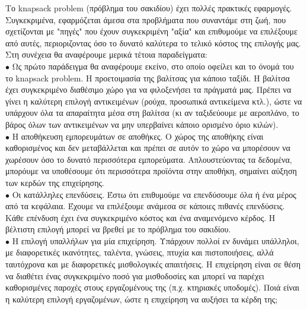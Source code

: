 \documentclass[12pt]{article}
\begin{document}
Το knapsack problem (πρόβλημα του σακιδίου) έχει πολλές πρακτικές εφαρμογές. Συγκεκριμένα, εφαρμόζεται άμεσα  στα προβλήματα που συναντάμε στη ζωή, που σχετίζονται με "πηγές" που έχουν συγκεκριμένη "αξία" και επιθυμούμε να επιλέξουμε από αυτές, περιοριζοντας όσο το δυνατό καλύτερα το τελικό κόστος της επιλογής μας.\\

Στη συνέχεια θα αναφέρουμε μερικά τέτοια παραδείγματα: \\
\(\bullet\) Ως πρώτο παράδειγμα θα αναφέρουμε εκείνο, στο οποίο οφείλει και το όνομά του το knapsack problem. Η προετοιμασία της βαλίτσας για κάποιο ταξίδι. Η βαλίτσα έχει συγκεκριμένο διαθέσιμο χώρο για να φιλοξενήσει τα πράγματά μας. Πρέπει να γίνει η καλύτερη επιλογή αντικειμένων (ρούχα, προσωπικά αντικείμενα κτλ.), ώστε να υπάρχουν όλα τα απαραίτητα μέσα στη βαλίτσα (κι αν ταξιδεύουμε με αεροπλάνο, το βάρος όλων των αντικειμένων να μην υπερβαίνει κάποιο ορισμένο όριο κιλών). \\

\(\bullet\) Η αποθήκευση εμπορευμάτων σε αποθήκες. Ο χώρος της αποθήκης είναι καθορισμένος και δεν μεταβάλλεται και πρέπει σε αυτόν το χώρο να μπορέσουν να χωρέσουν όσο το δυνατό περισσότερα εμπορεύματα. Απλουστεύοντας τα δεδομένα, μπορόυμε να υποθέσουμε ότι περισσότερα προϊόντα στην αποθήκη, σημαίνει αύξηση των κερδών της επιχείρησης. \\

\(\bullet\) Οι κατάλληλες επενδύσεις. Έστω  ότι επιθυμούμε να επενδύσουμε όλα ή ένα  μέρος  από τα κεφάλαια. Έχουμε να επιλέξουμε ανάμεσα  σε κάποιες πιθανές επενδύσεις. Κάθε επένδυση έχει ένα συγκεκριμένο κόστος και ένα αναμενόμενο κέρδος. Η βέλτιστη επιλογή μπορεί να βρεθεί με το πρόβλημα του σακιδίου. \\

\(\bullet\) Η επιλογή υπαλλήλων για μία επιχείρηση. Υπάρχουν πολλοί εν δυνάμει υπάλληλοι, με διαφορετικές ικανότητες, ταλέντα, γνώσεις, πτυχία και πιστοποιήσεις, αλλά ταυτόχρονα και με διαφορετικές μισθολογικές απαιτήσεις. Η επιχείρηση είναι σε θέση να διαθέτει ένας συγκεκριμένο ποσό για μισθοδοσίες και μπορεί να παρέχει καθορισμένες παροχές στους εργαζομένους της (π.χ. κτηριακές υποδομές). Ποιά είναι η καλύτερη επιλογή εργαζομένων, ώστε η επιχείρηση να αυξήσει τα κέρδη της; \\
\end{document}

